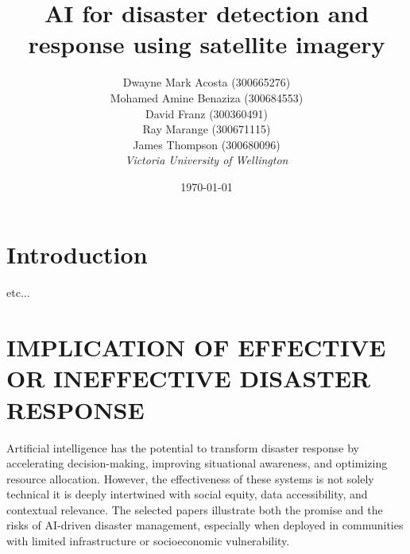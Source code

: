 \documentclass[conference,a4paper]{IEEEtran}
\begin{document}
\newcommand{\cfigure}[2]{%
  \begin{figure}[h]
    \centering
    \texttt{[image: figures/\#1.png]}%
    \caption{#2}%
    \label{fig:#1}%
  \end{figure}%

}
\title{AI for disaster detection and response using satellite imagery}

\author{Dwayne Mark Acosta (300665276) \\ Mohamed Amine Benaziza (300684553) \\ David Franz (300360491) \\ Ray Marange (300671115) \\ James Thompson (300680096)\\
\textit{Victoria University of Wellington}\\}
\date{\today}

\maketitle

\section{Introduction}


\cite{elbohy2025fusion} etc...


\section{IMPLICATION OF EFFECTIVE OR INEFFECTIVE DISASTER RESPONSE}
Artificial intelligence has the potential to transform disaster response by accelerating decision-making, improving situational awareness, and optimizing resource allocation. However, the effectiveness of these systems is not solely technical it is deeply intertwined with social equity, data accessibility, and contextual relevance. The selected papers illustrate both the promise and the risks of AI-driven disaster management, especially when deployed in communities with limited infrastructure or socioeconomic vulnerability.
\end{document}
